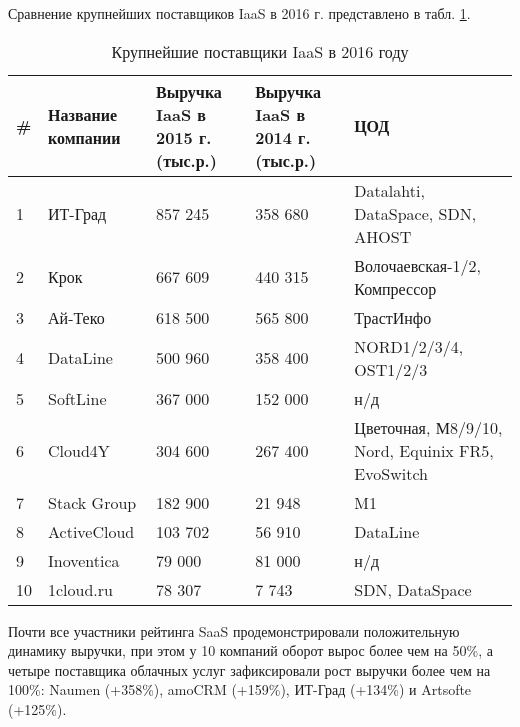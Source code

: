 Сравнение крупнейших поставщиков IaaS в 2016 г. \cite{cnews} представлено в табл. \ref{iaas-table}.
\begin{table}[H]
  \caption{Крупнейшие поставщики IaaS в 2016 году}\label{iaas-table}
  \begin{tabular}{|p{0.5cm}|p{2.5cm}|p{3.5cm}|p{3.5cm}|p{4.5cm}|}
  \hline \# & Название компании & Выручка IaaS в 2015 г. (тыс.р.) & Выручка IaaS в 2014 г. (тыс.р.) & ЦОД \\
  \hline 1 & ИТ-Град & 857 245 & 358 680 & Datalahti, DataSpace, SDN, AHOST \\
  \hline 2 & Крок & 667 609 & 440 315 & Волочаевская-1/2, Компрессор \\
  \hline 3 & Ай-Теко & 618 500 & 565 800 & ТрастИнфо \\
  \hline 4 & DataLine & 500 960 & 358 400 & NORD1/2/3/4, OST1/2/3 \\
  \hline 5 & SoftLine & 367 000 & 152 000 & н/д \\
  \hline 6 & Cloud4Y & 304 600 & 267 400 & Цветочная, М8/9/10, Nord, Equinix FR5, EvoSwitch \\
  \hline 7 & Stack Group & 182 900 & 21 948 & M1 \\
  \hline 8 & ActiveCloud & 103 702 & 56 910 & DataLine \\
  \hline 9 & Inoventica & 79 000 & 81 000 & н/д \\
  \hline 10 & 1cloud.ru & 78 307 & 7 743 & SDN, DataSpace \\
  \hline
  \end{tabular}
\end{table}

Почти все участники рейтинга SaaS продемонстрировали положительную динамику выручки, при этом у 10 компаний оборот вырос более чем на 50\%, а четыре поставщика облачных услуг зафиксировали рост выручки более чем на 100\%: Naumen (+358\%), amoCRM (+159\%), ИТ-Град (+134\%) и Artsofte (+125\%).

